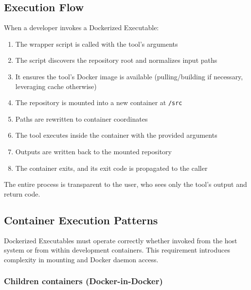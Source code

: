 \subsection{Execution Flow}

When a developer invokes a Dockerized Executable:

\begin{enumerate}
  \item The wrapper script is called with the tool's arguments

  \item The script discovers the repository root and normalizes input paths

  \item It ensures the tool's Docker image is available (pulling/building
    if necessary, leveraging cache otherwise)

  \item The repository is mounted into a new container at \texttt{/src}

  \item Paths are rewritten to container coordinates

  \item The tool executes inside the container with the provided arguments

  \item Outputs are written back to the mounted repository

  \item The container exits, and its exit code is propagated to the
    caller
\end{enumerate}

The entire process is transparent to the user, who sees only the tool's
output and return code.

\subsection{Container Execution Patterns}

Dockerized Executables must operate correctly whether invoked from the
host system or from within development containers. This requirement introduces
complexity in mounting and Docker daemon access.

\subsubsection{Children containers (Docker-in-Docker)}

